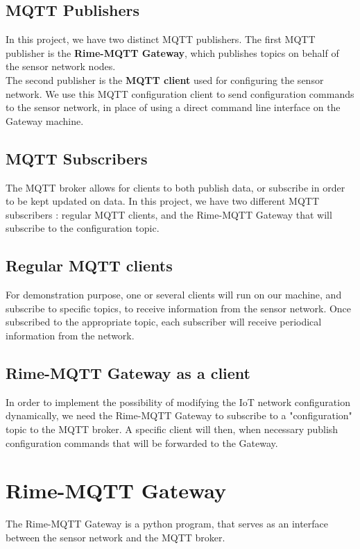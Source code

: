 \documentclass[a4paper,11pt]{article}
\begin{document}
\subsection{MQTT Publishers}
In this project, we have two distinct MQTT publishers. The first MQTT publisher is the \textbf{Rime-MQTT Gateway}, which publishes topics on behalf of the sensor network nodes.\\

The second publisher is the \textbf{MQTT client} used for configuring the sensor network. We use this MQTT configuration client to send configuration commands to the sensor network, in place of using a direct command line interface on the Gateway machine.

\subsection{MQTT Subscribers}
The MQTT broker allows for clients to both publish data, or subscribe in order to be kept updated on data. In this project, we have two different MQTT subscribers : regular MQTT clients, and the Rime-MQTT Gateway that will subscribe to the configuration topic.

\subsection{Regular MQTT clients}
For demonstration purpose, one or several clients will run on our machine, and subscribe to specific topics, to receive information from the sensor network. Once subscribed to the appropriate topic, each subscriber will receive periodical information from the network.

\subsection{Rime-MQTT Gateway as a client}
In order to implement the possibility of modifying the IoT network configuration dynamically, we need the Rime-MQTT Gateway to subscribe to a "configuration" topic to the MQTT broker. A specific client will then, when necessary publish configuration commands that will be forwarded to the Gateway.


\section{Rime-MQTT Gateway}
The Rime-MQTT Gateway is a python program, that serves as an interface between the sensor network and the MQTT broker.\\
\end{document}
